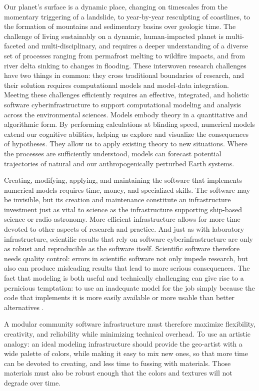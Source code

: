 \documentclass{article} %
\begin{document}
Our planet's surface is a dynamic place, changing on timescales from the momentary triggering of a landslide, to year-by-year resculpting of coastlines, to the formation of mountains and sedimentary basins over geologic time. The challenge of living sustainably on a dynamic, human-impacted planet is multi-faceted and multi-disciplinary, and requires a deeper understanding of a diverse set of processes ranging from permafrost melting to wildfire impacts, and from river delta sinking to changes in flooding. These interwoven research challenges have two things in common: they cross traditional boundaries of research, and their solution requires computational models and model-data integration. Meeting these challenges efficiently requires an effective, integrated, and holistic software cyberinfrastructure to support computational modeling and analysis across the environmental sciences. Models embody theory in a quantitative and algorithmic form. By performing calculations at blinding speed, numerical models extend our cognitive abilities, helping us explore and visualize the consequences of hypotheses. They allow us to apply existing theory to new situations. Where the processes are sufficiently understood, models can forecast potential trajectories of natural and our anthropogenically perturbed Earth systems.

Creating, modifying, applying, and maintaining the software that implements numerical models requires time, money, and specialized skills. The software may be invisible, but its creation and maintenance constitute an infrastructure investment just as vital to science as the infrastructure supporting ship-based science or radio astronomy. More efficient infrastructure allows for more time devoted to other aspects of research and practice. And just as with laboratory infrastructure, scientific results that rely on software cyberinfrastructure are only as robust and reproducible as the software itself. Scientific software therefore needs quality control: errors in scientific software not only impede research, but also can produce misleading results that lead to more serious consequences. The fact that modeling is both useful and technically challenging can give rise to a pernicious temptation: to use an inadequate model for the job simply because the code that implements it is more easily available or more usable than better alternatives \citep{addor2019legacy}. 

A modular community software infrastructure must therefore maximize flexibility, creativity, and reliability while minimizing technical overhead. To use an artistic analogy: an ideal modeling infrastructure should provide the geo-artist with a wide palette of colors, while making it easy to mix new ones, so that more time can be devoted to creating, and less time to fussing with materials. Those materials must also be robust enough that the colors and textures will not degrade over time.
\end{document}
